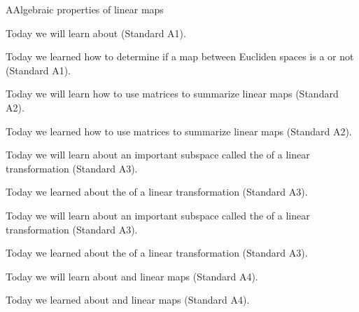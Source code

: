 \begin{module}{A}{Algebraic properties of linear maps}






\newModuleSection
\begin{goals}
Today we will learn about  (Standard A1).
\end{goals}
\begin{summary}
Today we learned how to determine if a map between Eucliden spaces is a   or not (Standard A1).
\end{summary}

\newModuleSection
\begin{goals}
Today we will learn how to use matrices to summarize linear maps (Standard A2).
\end{goals}
\begin{summary}
Today we learned how to use matrices to summarize linear maps (Standard A2).
\end{summary}

\newModuleSection
\begin{goals}
Today we will learn about an important subspace called the  of a linear transformation (Standard A3).
\end{goals}
\begin{summary}
Today we learned about the  of a linear transformation (Standard A3).
\end{summary}

\newModuleSection
\begin{goals}
Today we will learn about an important subspace called the  of a linear transformation (Standard A3).
\end{goals}
\begin{summary}
Today we learned about the  of a linear transformation (Standard A3).
\end{summary}

\newModuleSection
\begin{goals}
Today we will learn about  and  linear maps (Standard A4).
\end{goals}
\begin{summary}
Today we learned about  and  linear maps (Standard A4).
\end{summary}


\end{module}
